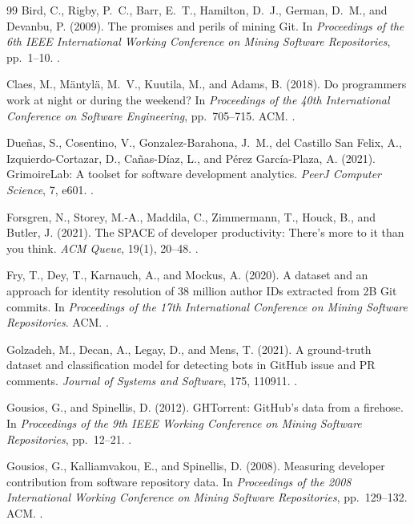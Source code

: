\begin{thebibliography}{99}
\label{refs:chapter04}
Bird, C., Rigby, P.~C., Barr, E.~T., Hamilton, D.~J., German, D.~M., and Devanbu, P. (2009).
The promises and perils of mining Git.
In \emph{Proceedings of the 6th IEEE International Working Conference on Mining Software Repositories}, pp.~1--10.
.

Claes, M., Mäntylä, M.~V., Kuutila, M., and Adams, B. (2018).
Do programmers work at night or during the weekend?
In \emph{Proceedings of the 40th International Conference on Software Engineering}, pp.~705--715. ACM.
.

Dueñas, S., Cosentino, V., Gonzalez-Barahona, J.~M., del Castillo San Felix, A., Izquierdo-Cortazar, D., Cañas-Díaz, L., and Pérez García-Plaza, A. (2021).
GrimoireLab: A toolset for software development analytics.
\emph{PeerJ Computer Science}, 7, e601.
.

Forsgren, N., Storey, M.-A., Maddila, C., Zimmermann, T., Houck, B., and Butler, J. (2021).
The SPACE of developer productivity: There's more to it than you think.
\emph{ACM Queue}, 19(1), 20--48.
.

Fry, T., Dey, T., Karnauch, A., and Mockus, A. (2020).
A dataset and an approach for identity resolution of 38 million author IDs extracted from 2B Git commits.
In \emph{Proceedings of the 17th International Conference on Mining Software Repositories}. ACM.
.

Golzadeh, M., Decan, A., Legay, D., and Mens, T. (2021).
A ground-truth dataset and classification model for detecting bots in GitHub issue and PR comments.
\emph{Journal of Systems and Software}, 175, 110911.
.

Gousios, G., and Spinellis, D. (2012).
GHTorrent: GitHub's data from a firehose.
In \emph{Proceedings of the 9th IEEE Working Conference on Mining Software Repositories}, pp.~12--21.
.

Gousios, G., Kalliamvakou, E., and Spinellis, D. (2008).
Measuring developer contribution from software repository data.
In \emph{Proceedings of the 2008 International Working Conference on Mining Software Repositories}, pp.~129--132. ACM.
.


\end{thebibliography}
